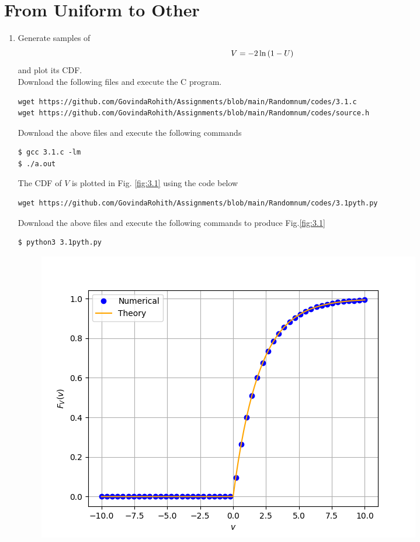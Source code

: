 \documentclass[journal,12pt,twocolumn]{IEEEtran}
\begin{document}
\section{From Uniform to Other}
\begin{enumerate}[label=\thesection.\arabic*
,ref=\thesection.\theenumi]
%
\item
Generate samples of 
%
\begin{equation}
V = -2\ln\left(1-U\right)
\end{equation}
%
and plot its CDF.  \\
\solution Download the following files and execute the  C program.
\begin{lstlisting}
wget https://github.com/GovindaRohith/Assignments/blob/main/Randomnum/codes/3.1.c
wget https://github.com/GovindaRohith/Assignments/blob/main/Randomnum/codes/source.h
\end{lstlisting}
Download the above files and execute the following commands
\begin{lstlisting}
$ gcc 3.1.c -lm
$ ./a.out
\end{lstlisting}
The CDF of $V$ is plotted in Fig. \ref{fig:3.1} using the code below
\begin{lstlisting}
wget https://github.com/GovindaRohith/Assignments/blob/main/Randomnum/codes/3.1pyth.py
\end{lstlisting}
Download the above files and execute the following commands to produce Fig.\ref{fig:3.1}
\begin{lstlisting}
$ python3 3.1pyth.py
\end{lstlisting}
\begin{figure}[!h]
\centering
\includegraphics[width=\columnwidth]{./figs/3.1.png}

\end{figure}
\end{enumerate}
\end{document}
